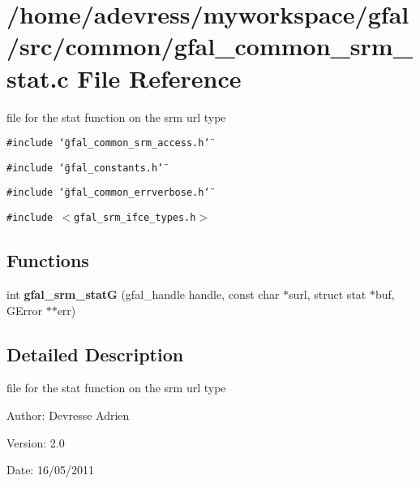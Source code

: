 \section{/home/adevress/myworkspace/gfal/src/common/gfal\_\-common\_\-srm\_\-stat.c File Reference}
\label{gfal__common__srm__stat_8c}
file for the stat function on the srm url type 

{\tt \#include \char`\"{}gfal\_\-common\_\-srm\_\-access.h\char`\"{}}\par
{\tt \#include \char`\"{}gfal\_\-constants.h\char`\"{}}\par
{\tt \#include \char`\"{}gfal\_\-common\_\-errverbose.h\char`\"{}}\par
{\tt \#include $<$gfal\_\-srm\_\-ifce\_\-types.h$>$}\par
\subsection*{Functions}
\begin{CompactItemize}
\item 
int \textbf{gfal\_\-srm\_\-stat\-G} (gfal\_\-handle handle, const char $\ast$surl, struct stat $\ast$buf, GError $\ast$$\ast$err)\label{gfal__common__srm__stat_8c_79b8e4b087251577b48119392e4daa35}

\end{CompactItemize}


\subsection{Detailed Description}
file for the stat function on the srm url type 

\begin{Desc}
\item[Author:]Devresse Adrien \end{Desc}
\begin{Desc}
\item[Version:]2.0 \end{Desc}
\begin{Desc}
\item[Date:]16/05/2011 \end{Desc}
